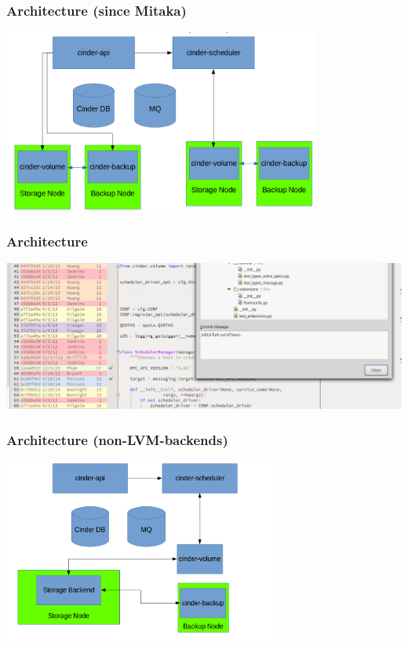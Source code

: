 \documentclass[aspectratio=169]{beamer}
\begin{document}
\begin{frame}
    \frametitle{Architecture (since Mitaka)}
    \begin{center}
        \includegraphics[height=6cm]{images/architecture-post-mitaka.png}
    \end{center}
\end{frame}

\begin{frame}
    \frametitle{Architecture}
    \begin{center}
        \includegraphics[width=\textwidth]{images/initial-fork.png}
    \end{center}
\end{frame}

\begin{frame}
    \frametitle{Architecture (non-LVM-backends)}
    \begin{center}
        \includegraphics[height=6cm]{images/architecture-prop.png}
    \end{center}
\end{frame}
\end{document}
